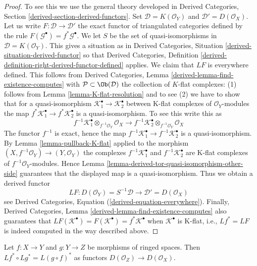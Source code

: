 \begin{proof}
To see this we use the general theory developed in
Derived Categories, Section \ref{derived-section-derived-functors}.
Set $\mathcal{D} = K(\mathcal{O}_Y)$ and $\mathcal{D}' = D(\mathcal{O}_X)$.
Let us write $F : \mathcal{D} \to \mathcal{D}'$ the exact functor
of triangulated categories defined by the rule
$F(\mathcal{G}^\bullet) = f^*\mathcal{G}^\bullet$.
We let $S$ be the set of quasi-isomorphisms in
$\mathcal{D} = K(\mathcal{O}_Y)$.
This gives a situation as in
Derived Categories, Situation \ref{derived-situation-derived-functor}
so that
Derived Categories, Definition
\ref{derived-definition-right-derived-functor-defined}
applies. We claim that $LF$ is everywhere defined.
This follows from
Derived Categories, Lemma \ref{derived-lemma-find-existence-computes}
with $\mathcal{P} \subset \Ob(\mathcal{D})$ the collection
of $K$-flat complexes: (1) follows from
Lemma \ref{lemma-K-flat-resolution}
and to see (2) we have to show that for a quasi-isomorphism
$\mathcal{K}_1^\bullet  \to \mathcal{K}_2^\bullet$ between
K-flat complexes of $\mathcal{O}_Y$-modules the map
$f^*\mathcal{K}_1^\bullet  \to f^*\mathcal{K}_2^\bullet$ is a
quasi-isomorphism. To see this write this as
$$
f^{-1}\mathcal{K}_1^\bullet \otimes_{f^{-1}\mathcal{O}_Y} \mathcal{O}_X
\longrightarrow
f^{-1}\mathcal{K}_2^\bullet \otimes_{f^{-1}\mathcal{O}_Y} \mathcal{O}_X
$$
The functor $f^{-1}$ is exact, hence the map
$f^{-1}\mathcal{K}_1^\bullet  \to f^{-1}\mathcal{K}_2^\bullet$ is a
quasi-isomorphism. By
Lemma \ref{lemma-pullback-K-flat}
applied to the morphism $(X, f^{-1}\mathcal{O}_Y) \to (Y, \mathcal{O}_Y)$
the complexes $f^{-1}\mathcal{K}_1^\bullet$ and $f^{-1}\mathcal{K}_2^\bullet$
are K-flat complexes of $f^{-1}\mathcal{O}_Y$-modules. Hence
Lemma \ref{lemma-derived-tor-quasi-isomorphism-other-side}
guarantees that the displayed map is a quasi-isomorphism.
Thus we obtain a derived functor
$$
LF :
D(\mathcal{O}_Y) = S^{-1}\mathcal{D}
\longrightarrow
\mathcal{D}' = D(\mathcal{O}_X)
$$
see
Derived Categories, Equation (\ref{derived-equation-everywhere}).
Finally,
Derived Categories, Lemma \ref{derived-lemma-find-existence-computes}
also guarantees that
$LF(\mathcal{K}^\bullet) = F(\mathcal{K}^\bullet) = f^*\mathcal{K}^\bullet$
when $\mathcal{K}^\bullet$ is K-flat, i.e., $Lf^* = LF$ is
indeed computed in the way described above.
\end{proof}

\begin{lemma}
\label{lemma-derived-pullback-composition}
Let $f : X \to Y$ and $g : Y \to Z$ be morphisms of ringed spaces.
Then $Lf^* \circ Lg^* = L(g \circ f)^*$ as functors
$D(\mathcal{O}_Z) \to D(\mathcal{O}_X)$.
\end{lemma}

